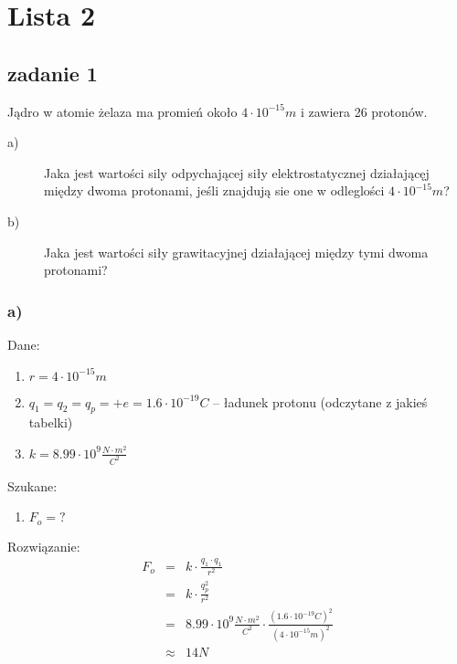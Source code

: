 \documentclass[svgnames]{report}
\begin{document}
\tableofcontents

\chapter{Lista 2}
\section{zadanie 1}
\begin{framed}
Jądro w atomie żelaza ma promień około $4\cdot 10^{-15} m$ i zawiera 26 protonów.
\begin{description}
	\item[a)] Jaka jest wartości sily odpychającej siły elektrostatycznej działającęj między dwoma protonami, jeśli znajdują sie one w odleglości $4 \cdot 10^{-15} m$?
	\item[b)] Jaka jest wartości siły grawitacyjnej działającej między tymi dwoma protonami?
\end{description}
\end{framed}

\subsection{a)}
Dane:
\begin{enumerate}
	\item $r = 4 \cdot 10^{-15} m$ 
	\item $q_1 = q_2 = q_p = +e = 1.6 \cdot 10^{-19} C$ -- ładunek protonu (odczytane z jakieś tabelki)
	\item $k = 8.99 \cdot 10^9 \frac{N \cdot m^2}{C^2}$
\end{enumerate}
Szukane:
\begin{enumerate}
	\item $F_o = ?$
\end{enumerate}
Rozwiązanie:
\begin{eqnarray*}
F_o 	&=& k \cdot \frac{q_1 \cdot q_1}{r^2}	\\
	&=& k \cdot \frac{q_p^2}{r^2}  	\\
	&=& 8.99 \cdot 10^9 \frac{N \cdot m^2}{C^2} \cdot \frac{(1.6 \cdot 10^{-19} C)^2}{(4 \cdot 10^{-15} m)^2}	\\
	& \approx & 14N	\\
\end{eqnarray*}
\end{document}
